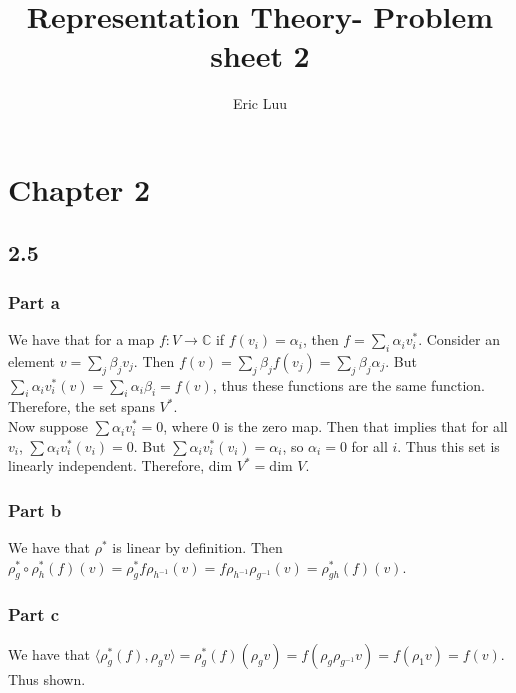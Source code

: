 \documentclass[]{article}
\title{Representation Theory- Problem sheet 2}
\author{Eric Luu}
\begin{document}
\maketitle

\section*{Chapter 2}
\subsection*{2.5}
\subsubsection*{Part a}
 We have that for a map $f: V \rightarrow \mathbb{C}$ if $f(v_i) = \alpha_i$, then $f = \sum_i \alpha_i v^*_i$. 
Consider an element $v = \sum_j \beta_j v_j$. Then $f(v) = \sum_j \beta_j f(v_j) = \sum_j \beta_j \alpha_j$. But $\sum_i \alpha_i v^*_i(v) = \sum_i \alpha_i \beta_i = f(v)$, thus these functions are the same function. Therefore, the set spans $V^*$.
\\
Now suppose $\sum \alpha_i v_i^* = 0$, where $0$ is the zero map. Then that implies that for all $v_i$, $\sum \alpha_i v_i^*(v_i) = 0$. But $\sum \alpha_i v_i^*(v_i) = \alpha_i$, so $\alpha_i = 0$ for all $i$. Thus this set is linearly independent.
Therefore, $\text{dim } V^* = \text{dim } V$. 
\subsubsection*{Part b}
We have that $\rho^*$ is linear by definition. Then $\rho^*_g \circ \rho^*_h (f) (v) = \rho^*_g f \rho_{h^{-1}}(v) = f \rho_{h^{-1}}\rho_{g^{-1}} (v) = \rho^*_{gh} (f)(v)$.
\subsubsection*{Part c}
We have that $\langle \rho^*_g(f) , \rho_g v \rangle = \rho^*_g(f) (\rho_g v) = f (\rho_g \rho_{g^{-1}} v) = f(\rho_1 v) = f(v)$. Thus shown.
\end{document}

